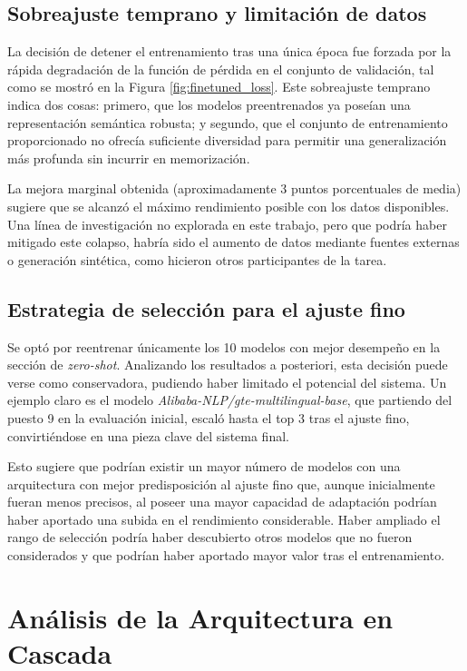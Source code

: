 \subsection{Sobreajuste temprano y limitación de datos}
\noindent La decisión de detener el entrenamiento tras una única época fue forzada por la rápida degradación de la función de pérdida en el conjunto de validación, tal como se mostró en la Figura \ref{fig:finetuned_loss}. Este sobreajuste temprano indica dos cosas: primero, que los modelos preentrenados ya poseían una representación semántica robusta; y segundo, que el conjunto de entrenamiento proporcionado no ofrecía suficiente diversidad para permitir una generalización más profunda sin incurrir en memorización.

La mejora marginal obtenida (aproximadamente 3 puntos porcentuales de media) sugiere que se alcanzó el máximo rendimiento posible con los datos disponibles. Una línea de investigación no explorada en este trabajo, pero que podría haber mitigado este colapso, habría sido el aumento de datos mediante fuentes externas o generación sintética, como hicieron otros participantes de la tarea.

\subsection{Estrategia de selección para el ajuste fino}
\noindent Se optó por reentrenar únicamente los 10 modelos con mejor desempeño en la sección de \textit{zero-shot}. Analizando los resultados a posteriori, esta decisión puede verse como conservadora, pudiendo haber limitado el potencial del sistema. Un ejemplo claro es el modelo \textit{Alibaba-NLP/gte-multilingual-base}, que partiendo del puesto 9 en la evaluación inicial, escaló hasta el top 3 tras el ajuste fino, convirtiéndose en una pieza clave del sistema final.

Esto sugiere que podrían existir un mayor número de modelos con una arquitectura con mejor predisposición al ajuste fino que, aunque inicialmente fueran menos precisos, al poseer una mayor capacidad de adaptación podrían haber aportado una subida en el rendimiento considerable. Haber ampliado el rango de selección podría haber descubierto otros modelos que no fueron considerados y que podrían haber aportado mayor valor tras el entrenamiento.

\section{Análisis de la Arquitectura en Cascada}

